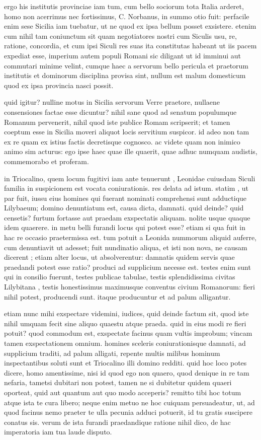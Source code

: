  ergo his institutis provinciae iam tum, cum bello sociorum tota Italia arderet, homo non acerrimus nec fortissimus, C. Norbanus, in summo otio fuit: perfacile enim sese Sicilia iam tuebatur, ut ne quod ex ipsa bellum posset exsistere. etenim cum nihil tam coniunctum sit quam negotiatores nostri cum Siculis usu, re, ratione, concordia, et cum ipsi Siculi res suas ita constitutas habeant ut iis pacem expediat esse, imperium autem populi Romani sic diligant ut id imminui aut commutari minime velint, cumque haec a servorum bello pericula et praetorum institutis et dominorum disciplina provisa sint, nullum est malum domesticum quod ex ipsa provincia nasci possit.

 quid igitur? nulline motus in Sicilia servorum Verre praetore, nullaene consensiones factae esse dicuntur? nihil sane quod ad senatum populumque Romanum pervenerit, nihil quod iste publice Romam scripserit; et tamen coeptum esse in Sicilia moveri aliquot locis servitium suspicor. id adeo non tam ex re quam ex istius factis decretisque cognosco. ac videte quam non inimico animo sim acturus: ego ipse haec quae ille quaerit, quae adhuc numquam audistis, commemorabo et proferam.

 in Triocalino, quem locum fugitivi iam ante tenuerunt , Leonidae cuiusdam Siculi familia in suspicionem est vocata coniurationis. res delata ad istum. statim , ut par fuit, iussu eius homines qui fuerant nominati comprehensi sunt adductique Lilybaeum; domino denuntiatum est, causa dicta, damnati. quid deinde? quid censetis? furtum fortasse aut praedam exspectatis aliquam. nolite usque quaque idem quaerere. in metu belli furandi locus qui potest esse? etiam si qua fuit in hac re occasio praetermissa est. tum potuit a Leonida nummorum aliquid auferre, cum denuntiavit ut adesset; fuit nundinatio aliqua, et isti non nova, ne causam dicerent ; etiam alter locus, ut absolverentur: damnatis quidem servis quae praedandi potest esse ratio? produci ad supplicium necesse est. testes enim sunt qui in consilio fuerunt, testes publicae tabulae, testis splendidissima civitas Lilybitana , testis honestissimus maximusque conventus civium Romanorum: fieri nihil potest, producendi sunt. itaque producuntur et ad palum alligantur.

 etiam nunc mihi exspectare videmini, iudices, quid deinde factum sit, quod iste nihil umquam fecit sine aliquo quaestu atque praeda. quid in eius modi re fieri potuit? quod commodum est, exspectate facinus quam vultis improbum; vincam tamen exspectationem omnium. homines sceleris coniurationisque damnati, ad supplicium traditi, ad palum alligati, repente multis milibus hominum inspectantibus soluti sunt et Triocalino illi domino redditi. quid hoc loco potes dicere, homo amentissime, nisi id quod ego non quaero, quod denique in re tam nefaria, tametsi dubitari non potest, tamen ne si dubitetur quidem quaeri oporteat, quid aut quantum aut quo modo acceperis? remitto tibi hoc totum atque ista te cura libero; neque enim metuo ne hoc cuiquam persuadeatur, ut, ad quod facinus nemo praeter te ulla pecunia adduci potuerit, id tu gratis suscipere conatus sis. verum de ista furandi praedandique ratione nihil dico, de hac imperatoria iam tua laude disputo.

